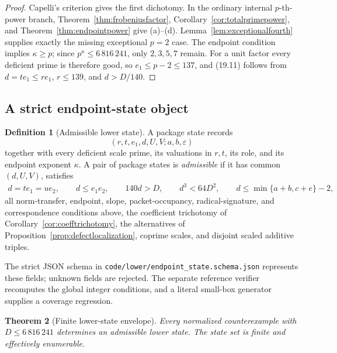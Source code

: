 \documentclass[11pt]{article}
\newtheorem{theorem}{Theorem}[section]
\theoremstyle{definition}
\newtheorem{definition}[theorem]{Definition}
\begin{document}
\begin{proof}
Capelli's criterion gives the first dichotomy.  In the ordinary internal
\(p\)-th-power branch, Theorem~\ref{thm:frobeniusfactor},
Corollary~\ref{cor:totalprimepower}, and Theorem~\ref{thm:endpointpower}
give (a)--(d).  Lemma~\ref{lem:exceptionalfourth} supplies exactly the
missing exceptional \(p=2\) case.  The endpoint condition implies
\(\kappa\geq p\); since \(p^\kappa\leq6\,816\,241\), only
\(2,3,5,7\) remain.  For a unit factor every deficient prime is therefore
good, so \(e_1\leq p-2\leq137\), and (19.11) follows from
\(d=te_1\leq re_1\), \(r\leq139\), and \(d>D/140\).
\end{proof}

\subsection{A strict endpoint-state object}

\begin{definition}[Admissible lower state]\label{def:endpointstate}
A package state records
\[
 (r,t,e_1,d,U,V;a,b,\varepsilon)
\]
together with every deficient scale prime, its valuations in \(r,t\), its
role, and its endpoint exponent \(\kappa\).  A pair of package states is
\emph{admissible} if it has common \((d,U,V)\), satisfies
\begin{gather*}
 d=te_1=ue_2,\qquad d\leq e_1e_2,
 \qquad 140d>D,
 \qquad d^3<64D^2,
 \qquad d\leq\min\{a+b,c+e\}-2,\tag{19.12}
\end{gather*}
all norm-transfer, endpoint, slope, packet-occupancy, radical-signature, and
correspondence conditions above, the coefficient trichotomy of
Corollary~\ref{cor:coefftrichotomy}, the alternatives of
Proposition~\ref{prop:defectlocalization}, coprime scales, and disjoint scaled
additive triples.
\end{definition}

The strict JSON schema in
\texttt{code/lower/endpoint\_state.schema.json} represents these fields;
unknown fields are rejected.  The separate reference verifier recomputes the
global integer conditions, and a literal small-box generator supplies a
coverage regression.

\begin{theorem}[Finite lower-state envelope]\label{thm:lowerstatereduction}
Every normalized counterexample with \(D\leq6\,816\,241\) determines an
admissible lower state.  The state set is finite and effectively enumerable.
\end{theorem}
\end{document}
